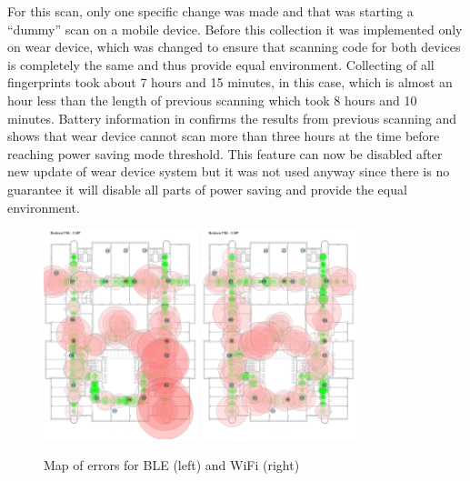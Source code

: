 For this scan, only one specific change was made and that was starting a \enquote{dummy} scan on a mobile device. Before this collection it was implemented only on wear device, which was changed to ensure that scanning code for both devices is completely the same and thus provide equal environment. Collecting of all fingerprints took about 7 hours and 15 minutes, in this case, which is almost an hour less than the length of previous scanning which took 8 hours and 10 minutes. Battery information in  confirms the results from previous scanning and shows that wear device cannot scan more than three hours at the time before reaching power saving mode threshold. This feature can now be disabled after new update of wear device system but it was not used anyway since there is no guarantee it will disable all parts of power saving and provide the equal environment.

\begin{figure}[h!]
	\begin{centering}
		\includegraphics[width=0.4\textwidth]{img/third_data_collection_ble_errors}
		\includegraphics[width=0.4\textwidth]{img/third_data_collection_wifi_errors}
		\par\end{centering}
	\caption{Map of errors for BLE (left) and WiFi (right)}
	\label{fig03c06}
\end{figure}

